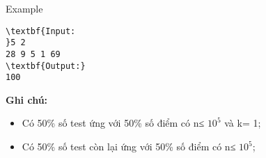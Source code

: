Example
\begin{verbatim}
\textbf{Input:
}5 2
28 9 5 1 69
\textbf{Output:}
100
\end{verbatim}

\textbf{Ghi chú:}
\begin{itemize}
	\item Có 50\% số test ứng với 50\% số điểm có n≤ $10^{5}$ và k= 1;
	\item Có 50\% số test còn lại ứng với 50\% số điểm có n≤ $10^{5}$;
\end{itemize}